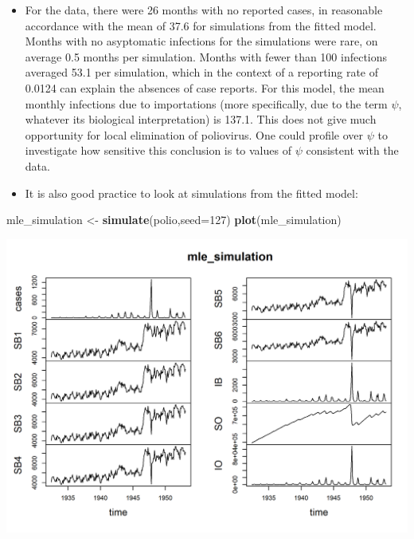\documentclass[]{article}
\newenvironment{Shaded}{\begin{snugshade}}{\end{snugshade}}
\newcommand{\KeywordTok}[1]{\textcolor[rgb]{0.13,0.29,0.53}{\textbf{#1}}}
\newcommand{\DataTypeTok}[1]{\textcolor[rgb]{0.13,0.29,0.53}{#1}}
\newcommand{\DecValTok}[1]{\textcolor[rgb]{0.00,0.00,0.81}{#1}}
\newcommand{\StringTok}[1]{\textcolor[rgb]{0.31,0.60,0.02}{#1}}
\newcommand{\NormalTok}[1]{#1}
\begin{document}
\begin{itemize}
\item
  For the data, there were 26 months with no reported cases, in
  reasonable accordance with the mean of 37.6 for simulations from the
  fitted model. Months with no asyptomatic infections for the
  simulations were rare, on average 0.5 months per simulation. Months
  with fewer than 100 infections averaged 53.1 per simulation, which in
  the context of a reporting rate of 0.0124 can explain the absences of
  case reports. For this model, the mean monthly infections due to
  importations (more specifically, due to the term \(\psi\), whatever
  its biological interpretation) is 137.1. This does not give much
  opportunity for local elimination of poliovirus. One could profile
  over \(\psi\) to investigate how sensitive this conclusion is to
  values of \(\psi\) consistent with the data.
\item
  It is also good practice to look at simulations from the fitted model:
\end{itemize}

\begin{Shaded}
\begin{Highlighting}[]
\NormalTok{mle_simulation <-}\StringTok{ }\KeywordTok{simulate}\NormalTok{(polio,}\DataTypeTok{seed=}\DecValTok{127}\NormalTok{)}
\KeywordTok{plot}\NormalTok{(mle_simulation)}
\end{Highlighting}
\end{Shaded}

\begin{center}\includegraphics{figure/sp500-plot_simulated-1} \end{center}
\end{document}
